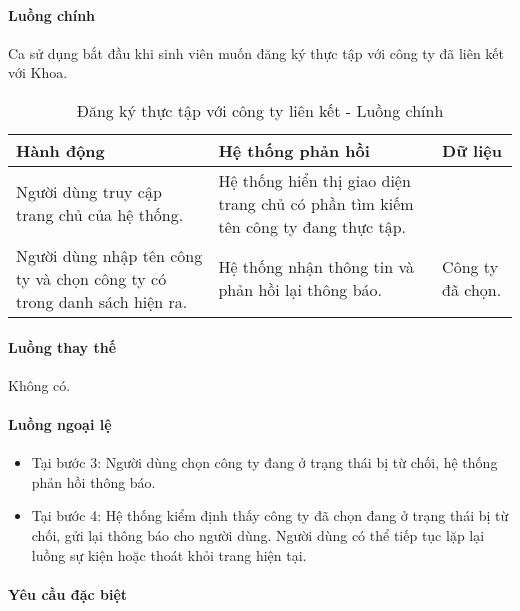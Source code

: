 \documentclass[./../main.tex]{subfiles}
\begin{document}
\paragraph*{Luồng chính} Ca sử dụng bắt đầu khi sinh viên muốn đăng ký thực tập với công ty đã liên kết với Khoa.

\begin{table}[H]
  \caption{Đăng ký thực tập với công ty liên kết - Luồng chính}
  \label{tab:register_company}
  \begin{tabularx}{\textwidth}{|X|X|X|}
  \hline
  \textbf{Hành động}                                                      & \textbf{Hệ thống phản hồi}                                                        & \textbf{Dữ liệu} \\ \hline
  Người dùng truy cập trang chủ của hệ thống.                             & Hệ thống hiển thị giao diện trang chủ có phần tìm kiếm tên công ty đang thực tập. &                  \\ \hline
  Người dùng nhập tên công ty và chọn công ty có trong danh sách hiện ra. & Hệ thống nhận thông tin và phản hồi lại thông báo.                                & Công ty đã chọn. \\ \hline
  \end{tabularx}
\end{table}

\paragraph*{Luồng thay thế} Không có.

\paragraph*{Luồng ngoại lệ}

\begin{itemize}
\item
  Tại bước 3: Người dùng chọn công ty đang ở trạng thái bị từ chối, hệ
  thống phản hồi thông báo.
\item
  
  Tại bước 4: Hệ thống kiểm định thấy công ty đã chọn đang ở trạng thái
  bị từ chối, gửi lại thông báo cho người dùng. Người dùng có thể tiếp
  tục lặp lại luồng sự kiện hoặc thoát khỏi trang hiện tại.
  
\end{itemize}

\paragraph*{Yêu cầu đặc biệt}
\end{document}
